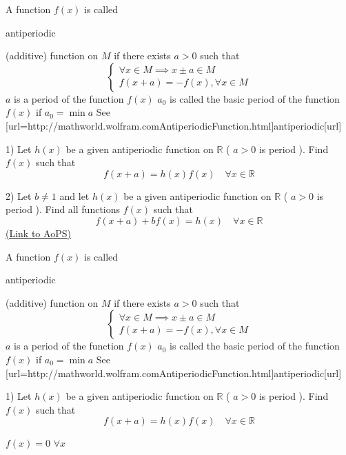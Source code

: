 \begin{problem}
	A function $ f(x)$ is called \begin{bolded}antiperiodic\end{bolded} (additive)  function on $M$ if there exists $ a>0$ such that
          \[\begin{cases}\forall x\in M \implies x\pm a\in M \\f(x+a)= -f(x) , \forall x\in M \end{cases}\]
 $ a$ is a period  of the  function $ f(x)$
 $ a_0$ is called the basic period of the function $ f(x)$ if $ a_0=\min{a}$
See [url=http://mathworld.wolfram.com\/AntiperiodicFunction.html]antiperiodic[\/url]

1) Let $h(x)$ be a given antiperiodic function on $\mathbb R$ ( $a>0$ is period ). Find $f(x)$ such that \[f(x+a)=h(x)f(x) \quad \forall x\in\mathbb R\]

2) Let $b\neq 1$ and let $h(x)$ be a  given antiperiodic function on $\mathbb R$ ( $a>0$ is period ). Find all functions $f(x)$ such that  \[f(x+a)+bf(x)=h(x) \quad \forall x\in\mathbb R \]
	\flushright \href{https://artofproblemsolving.com/community/c6h571573}{(Link to AoPS)}
\end{problem}



\begin{solution}
	\begin{tcolorbox}A function $ f(x)$ is called \begin{bolded}antiperiodic\end{bolded} (additive)  function on $M$ if there exists $ a>0$ such that
          \[\begin{cases}\forall x\in M \implies x\pm a\in M \\f(x+a)= -f(x) , \forall x\in M \end{cases}\]
 $ a$ is a period  of the  function $ f(x)$
 $ a_0$ is called the basic period of the function $ f(x)$ if $ a_0=\min{a}$
See [url=http://mathworld.wolfram.com\/AntiperiodicFunction.html]antiperiodic[\/url]

1) Let $h(x)$ be a given antiperiodic function on $\mathbb R$ ( $a>0$ is period ). Find $f(x)$ such that \[f(x+a)=h(x)f(x) \quad \forall x\in\mathbb R\]
\end{tcolorbox}
$f(x)=0$ $\forall x$
\end{solution}




